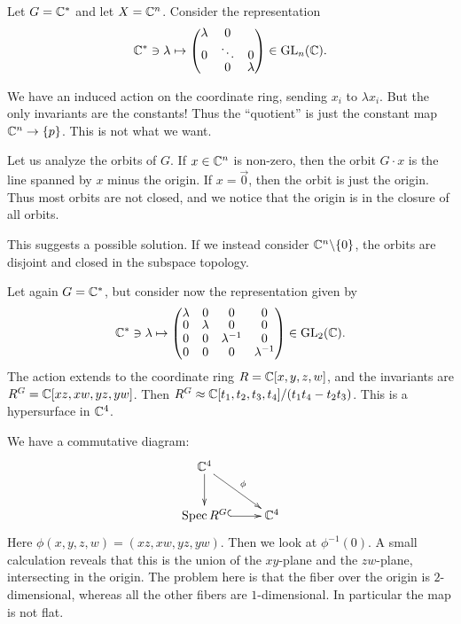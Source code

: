 \documentclass[11pt, english]{article}
\begin{document}
\begin{example}
  Let $G = \mathbb{C}^\ast$ and let $X = \mathbb{C}^n$. Consider the representation
$$
\C^\ast \ni \lambda \mapsto 
\begin{pmatrix}
  \lambda & 0 & \\
0 & \ddots &0 \\
&0 & \lambda
\end{pmatrix} \in \GL_n(\C).
$$

We have an induced action on the coordinate ring, sending $x_i$ to $\lambda x_i$. But the only invariants are the constants! Thus the ``quotient'' is just the constant map $\mathbb{C}^n \to \{p\}$. This is not what we want.

Let us analyze the orbits of $G$. If $x \in \mathbb{C}^n$ is non-zero, then the orbit $G \cdot x$ is the line spanned by $x$ minus the origin. If $x=\vec 0$, then the orbit is just the origin. Thus most orbits are not closed, and we notice that the origin is in the closure of all orbits. 

This suggests a possible solution. If we instead consider $\mathbb{C}^n \backslash \{ 0\}$, the orbits are disjoint and closed in the subspace topology.
\end{example}

\begin{example}
Let again $G = \mathbb{C}^\ast$, but consider now the representation given by
$$
\C^\ast \ni \lambda \mapsto 
\begingroup
\renewcommand*{\arraystretch}{0.8}
\begin{pmatrix}
  \lambda & 0& 0& 0 \\
0& \lambda & 0 &0  \\
0  & 0 & \lambda^{-1} &0 \\
0& 0 &0& \lambda^{-1}
\end{pmatrix}  \in \GL_2(\C).
\endgroup
$$
The action extends to the coordinate ring $R= \mathbb{C}[x,y,z,w]$, and the invariants are $R^G=\mathbb{C}[xz,xw,yz,yw]$. Then $R^G \approx \mathbb{C}[t_1,t_2,t_3,t_4]/(t_1t_4-t_2t_3)$. This is a hypersurface in $\mathbb{C}^4$. 

We have a commutative diagram:
\[
\xymatrix{
\C^4 \ar[d] \ar[dr]^\phi & \\
\Spec R^G \ar@{^(->}[r] & \C^4
}
\]
Here $\phi(x,y,z,w)=(xz,xw,yz,yw)$. Then we look at $\phi^{-1}(0)$. A small calculation reveals that this is the union of the $xy$-plane and the $zw$-plane, intersecting in the origin. The problem here is that the fiber over the origin is $2$-dimensional, whereas all the other fibers are $1$-dimensional. In particular the map is not flat.
\end{example}
\end{document}
